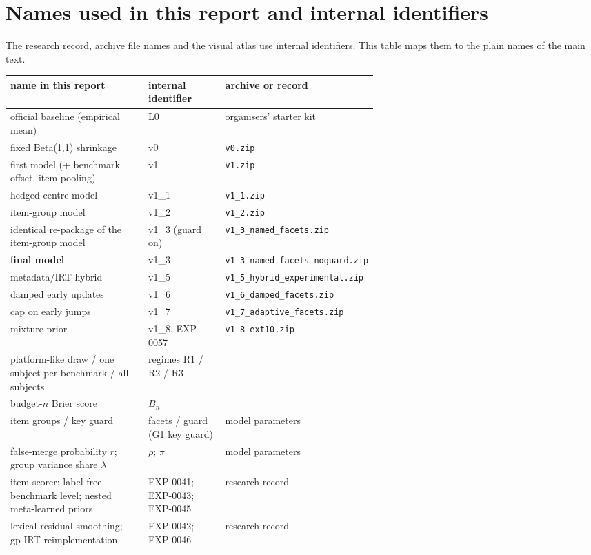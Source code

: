 \documentclass{article}
\begin{document}
\section{Names used in this report and internal identifiers}\label{app:names}
The research record, archive file names and the visual atlas use internal identifiers. This table maps them to the
plain names of the main text.
\begin{center}\scriptsize
\begin{tabular}{@{}p{0.40\linewidth}p{0.22\linewidth}l@{}}
\toprule
name in this report & internal identifier & archive or record\\
\midrule
official baseline (empirical mean) & L0 & organisers' starter kit\\
fixed Beta(1,1) shrinkage & v0 & \texttt{v0.zip}\\
first model (+ benchmark offset, item pooling) & v1 & \texttt{v1.zip}\\
hedged-centre model & v1\_1 & \texttt{v1\_1.zip}\\
item-group model & v1\_2 & \texttt{v1\_2.zip}\\
identical re-package of the item-group model & v1\_3 (guard on) & \texttt{v1\_3\_named\_facets.zip}\\
\textbf{final model} & v1\_3 & \texttt{v1\_3\_named\_facets\_noguard.zip}\\
metadata/IRT hybrid & v1\_5 & \texttt{v1\_5\_hybrid\_experimental.zip}\\
damped early updates & v1\_6 & \texttt{v1\_6\_damped\_facets.zip}\\
cap on early jumps & v1\_7 & \texttt{v1\_7\_adaptive\_facets.zip}\\
mixture prior & v1\_8, EXP-0057 & \texttt{v1\_8\_ext10.zip}\\
\midrule
platform-like draw / one subject per benchmark / all subjects & regimes R1 / R2 / R3 & \\
budget-$n$ Brier score & $B_n$ & \\
item groups / key guard & facets / guard (G1 key guard) & model parameters\\
false-merge probability $r$; group variance share $\lambda$ & $\rho$; $\pi$ & model parameters\\
\midrule
item scorer; label-free benchmark level; nested meta-learned priors & EXP-0041; EXP-0043; EXP-0045 & research record\\
lexical residual smoothing; gp-IRT reimplementation & EXP-0042; EXP-0046 & research record\\

\end{tabular}
\end{center}
\end{document}
